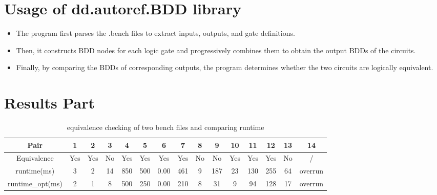 \documentclass{article}
\begin{document}
\section{Usage of dd.autoref.BDD library}

\begin{itemize}
    \item The program first parses the .bench files to extract inputs, outputs, and gate definitions.
    \item Then, it constructs BDD nodes for each logic gate and progressively combines them to obtain the output BDDs of the circuits.
    \item Finally, by comparing the BDDs of corresponding outputs, the program determines whether the two circuits are logically equivalent.
\end{itemize}

\section{Results Part}
\begin{table}[H]
\centering
\caption{equivalence checking of two bench files and comparing runtime}
\small
\begin{tabular}{c|cccccccccccccc}
\toprule
Pair & 1 & 2 & 3 & 4 & 5 & 6 & 7 & 8 & 9 & 10 & 11 & 12 & 13 & 14\\
\midrule
Equivalence & Yes & Yes & No & Yes & Yes & Yes& Yes & No & No & Yes & Yes & Yes & No & / \\
runtime(ms) & 3 & 2 & 14 & 850& 500 & 0.00 & 461 & 9 & 187 & 23 & 130 & 255 & 64 & overrun \\
runtime\_opt(ms) & 2 & 1 & 8 & 500 & 250 & 0.00 & 210 & 8 & 31 & 9 & 94 & 128 & 17 & overrun\\
\bottomrule
\end{tabular}
\end{table}
\end{document}
